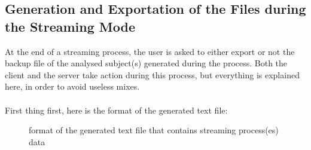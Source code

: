 \documentclass[a4paper,11pt]{report}
\begin{document}
\subsection{Generation and Exportation of the Files during the Streaming Mode}
\label{generationOfStreamingFile}
At the end of a streaming process, the user is asked to either export or not the backup file of the analysed subject(s) generated during the process. Both the client and the server take action during this process, but everything is explained here, in order to avoid useless mixes.\\\\
First thing first, here is the format of the generated text file:
\begin{figure}[H]
\vspace{-5pt}
\begin{center}
\vspace{-5pt}
\caption{format of the generated text file that contains streaming process(es) data}
\end{center}
\end{figure}
\end{document}
